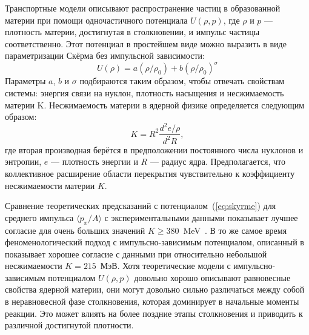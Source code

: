 Транспортные модели описывают распространение частиц в образованной материи при помощи одночастичного потенциала $U(\rho, p)$, где $\rho$ и $p$ --- плотность материи, достигнутая в столкновении, и импульс частицы соответственно.
Этот потенциал в простейшем виде можно выразить в виде параметризации Скёрма без импульсной зависимости:
\begin{equation}
    U(\rho) = a(\rho/\rho_0) + b(\rho/\rho_0)^\sigma
    \label{eq:skyrme}
\end{equation}
Параметры $a$, $b$ и $\sigma$ подбираются таким образом, чтобы отвечать свойствам системы: энергия связи на нуклон, плотность насыщения и несжимаемость материи K.
Несжимаемость материи в ядерной физике определяется следующим образом:
\begin{equation}
    K = R^2 \frac{d^2 e/\rho}{ d^2 R },
\end{equation}
где вторая производная берётся в предположении постоянного числа нуклонов и энтропии, $e$ --- плотность энергии и $R$ --- радиус ядра.
Предполагается, что коллективное расширение области перекрытия чувствительно к коэффициенту несжимаемости материи $K$.

Сравнение теоретических предсказаний с потенциалом~(\ref{eq:skyrme}) для среднего импульса $\langle p_x / A \rangle$ с экспериментальными данными показывает лучшее согласие для очень больших значений $K \ge 380$~MeV~\cite{Kruse:1985hy, Molitoris:1985gs}.
В то же самое время феноменологический подход с импульсно-зависимым потенциалом, описанный в~\cite{Gale:1987zz, Aichelin:1987ti, Welke:1988zz, Haddad:1995vt} показывает хорошее согласие с данными при относительно небольшой несжимаемости $K=215$~МэВ.
Хотя теоретические модели с импульсно-зависимым потенциалом $U(\rho, p)$ довольно хорошо описывают равновесные свойства ядерной материи, они могут довольно сильно различаться между собой в неравновесной фазе столкновения, которая доминирует в начальные моменты реакции.
Это может влиять на более поздние этапы столкновения и приводить к различной достигнутой плотности.

